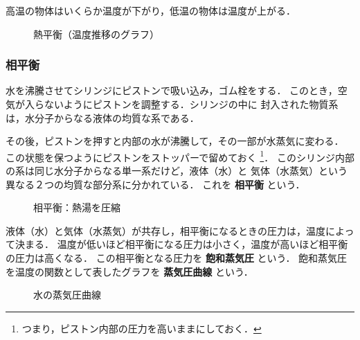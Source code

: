         高温の物体はいくらか温度が下がり，低温の物体は温度が上がる．
        \begin{figure}[hbt]
            \begin{center}
                \caption{熱平衡（温度推移のグラフ）}
                \label{fig:netsu_heikou}
            \end{center}
        \end{figure}

        \subsubsection{相平衡}\label{sbsbsec:sou_heikou}
        水を沸騰させてシリンジにピストンで吸い込み，ゴム栓をする．
        このとき，空気が入らないようにピストンを調整する．シリンジの中に
        封入された物質系は，水分子からなる液体の均質な系である．

        その後，ピストンを押すと内部の水が沸騰して，その一部が水蒸気に変わる．
        この状態を保つようにピストンをストッパーで留めておく
            \footnote{
                つまり，ピストン内部の圧力を高いままにしておく．
            }．
        このシリンジ内部の系は同じ水分子からなる単一系だけど，液体（水）と
        気体（水蒸気）という異なる２つの均質な部分系に分かれている．
        これを \textbf{相平衡} という．
        \begin{figure}[hbt]
            \begin{center}
                \caption{相平衡：熱湯を圧縮}
                \label{fig:netsu_heikou}
            \end{center}
        \end{figure}

        液体（水）と気体（水蒸気）が共存し，相平衡になるときの圧力は，温度によって決まる．
        温度が低いほど相平衡になる圧力は小さく，温度が高いほど相平衡の圧力は高くなる．
        この相平衡となる圧力を \textbf{飽和蒸気圧} という．
        飽和蒸気圧を温度の関数として表したグラフを \textbf{蒸気圧曲線} という．
        \begin{figure}[hbt]
            \begin{center}
                \caption{水の蒸気圧曲線}
                \label{fig:sou_heikou_graph}
            \end{center}
        \end{figure}

